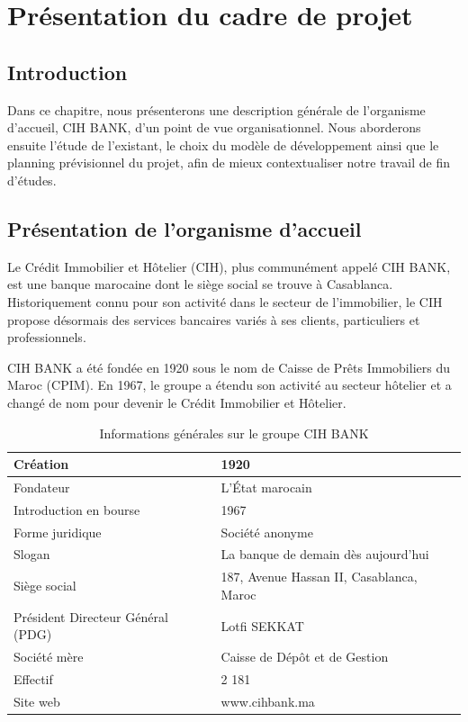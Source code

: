 \chapter{Présentation du cadre de projet}

\section*{Introduction}
Dans ce chapitre, nous présenterons une description générale de l’organisme d’accueil, CIH BANK, d’un point de vue organisationnel. Nous aborderons ensuite l'étude de l'existant, le choix du modèle de développement ainsi que le planning prévisionnel du projet, afin de mieux contextualiser notre travail de fin d'études.

\section{Présentation de l'organisme d'accueil}

Le Crédit Immobilier et Hôtelier (CIH), plus communément appelé CIH BANK, est une banque marocaine dont le siège social se trouve à Casablanca. Historiquement connu pour son activité dans le secteur de l’immobilier, le CIH propose désormais des services bancaires variés à ses clients, particuliers et professionnels.

CIH BANK a été fondée en 1920 sous le nom de Caisse de Prêts Immobiliers du Maroc (CPIM). En 1967, le groupe a étendu son activité au secteur hôtelier et a changé de nom pour devenir le Crédit Immobilier et Hôtelier.

\begin{table}[h]
\centering
\begin{tabular}{|l|l|}
\hline
Création & 1920 \\
\hline
Fondateur & L’État marocain \\
\hline
Introduction en bourse & 1967 \\
\hline
Forme juridique & Société anonyme \\
\hline
Slogan & La banque de demain dès aujourd’hui \\
\hline
Siège social & 187, Avenue Hassan II, Casablanca, Maroc \\
\hline
Président Directeur Général (PDG) & Lotfi SEKKAT \\
\hline
Société mère & Caisse de Dépôt et de Gestion \\
\hline
Effectif & 2 181 \\
\hline
Site web & www.cihbank.ma \\
\hline
\end{tabular}
\caption{Informations générales sur le groupe CIH BANK}
\end{table}

